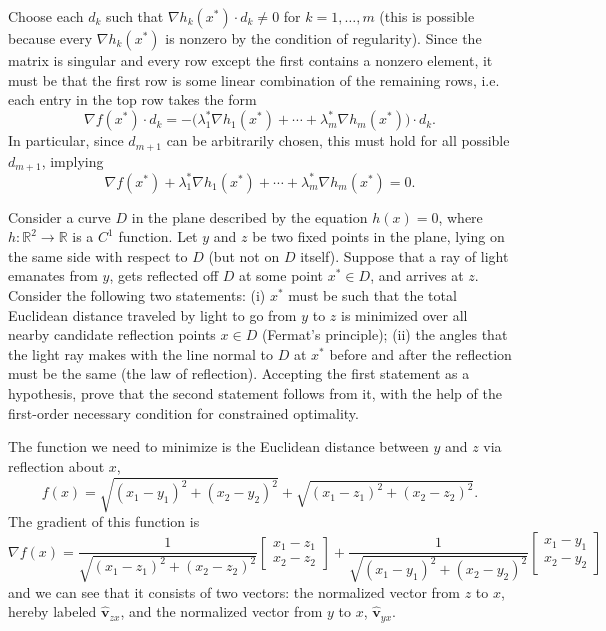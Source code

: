 \documentclass[../calculus-of-variations-and-optimal-control-theory.tex]{subfiles}
\begin{document}
\begin{questions}
\begin{solution}
	Choose each $d_k$ such that $\nabla h_k(x^*) \cdot d_k \neq 0$ for $k=1,\dots,m$ (this is possible because every $\nabla h_k(x^*)$ is nonzero by the condition of regularity). Since the matrix is singular and every row except the first contains a nonzero element, it must be that the first row is some linear combination of the remaining rows, i.e. each entry in the top row takes the form
	\[
		\nabla f(x^*) \cdot d_k = -\big(\lambda^*_1\nabla h_1(x^*) + \cdots + \lambda^*_m\nabla h_m(x^*)\big)\cdot d_k.
	\]
	In particular, since $d_{m+1}$ can be arbitrarily chosen, this must hold for all possible $d_{m+1}$, implying
	\[
		\nabla f(x^*) + \lambda^*_1\nabla h_1(x^*) + \cdots + \lambda^*_m\nabla h_m(x^*) = 0.
	\]
\end{solution}

\question Consider a curve $D$ in the plane described by the equation $h(x) = 0$, where $h: \mathbb{R}^2 \to \mathbb{R}$ is a $C^1$ function. Let $y$ and $z$ be two fixed points in the plane, lying on the same side with respect to $D$ (but not on $D$ itself). Suppose that a ray of light emanates from $y$, gets reflected off $D$ at some point $x^* \in D$, and arrives at $z$. Consider the following two statements: (i) $x^*$ must be such that the total Euclidean distance traveled by light to go from $y$ to $z$ is minimized over all nearby candidate reflection points $x\in D$ (Fermat's principle); (ii) the angles that the light ray makes with the line normal to $D$ at $x^*$ before and after the reflection must be the same (the law of reflection). Accepting the first statement as a hypothesis, prove that the second statement follows from it, with the help of the first-order necessary condition for constrained optimality.

\begin{solution}
	The function we need to minimize is the Euclidean distance between $y$ and $z$ via reflection about $x$,
	\[
		f(x) = \sqrt{(x_1 - y_1)^2 + (x_2 - y_2)^2} + \sqrt{(x_1 - z_1)^2 + (x_2 - z_2)^2}.
	\]
	The gradient of this function is
	\[
		\nabla f(x) = \frac{1}{\sqrt{(x_1-z_1)^2 + (x_2 - z_2)^2}}\begin{bmatrix}
			x_1 - z_1 \\ x_2 - z_2
		\end{bmatrix} + \frac{1}{\sqrt{(x_1-y_1)^2 + (x_2 - y_2)^2}}\begin{bmatrix}
		x_1 - y_1 \\ x_2 - y_2
		\end{bmatrix}
	\]
	and we can see that it consists of two vectors: the normalized vector from $z$ to $x$, hereby labeled $\hat{\mathbf{v}}_{zx}$, and the normalized vector from $y$ to $x$, $\hat{\mathbf{v}}_{yx}$.
	

\end{solution}
\end{questions}
\end{document}
